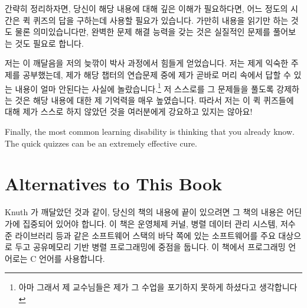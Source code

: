 간략히 정리하자면, 당신이 해당 내용에 대해 깊은 이해가 필요하다면, 어느 정도의
시간은 퀵 퀴즈의 답을 구하는데 사용할 필요가 있습니다.
가만히 내용을 읽기만 하는 것도 물론 의미있습니다만, 완벽한 문제 해결 능력을
갖는 것은 실질적인 문제를 풀어보는 것도 필요로 합니다.

\iffalse
In short, if you need a deep
understanding of the material, then you should invest some time
into answering the Quick Quizzes.
Don't get me wrong, passively reading the material can be quite
valuable, but gaining full problem-solving capability really
does require that you practice solving problems.
\fi

저는 이 깨달음을 저의 늦깎이 박사 과정에서 힘들게 얻었습니다.  저는 제게 익숙한
주제를 공부했는데, 제가 해당 챕터의 연습문제 중에 제가 곧바로 머리 속에서 답할
수 있는 내용이 얼마 안된다는 사실에 놀랐습니다.\footnote{ 아마 그래서 제
교수님들은 제가 그 수업을 포기하지 못하게 하셨다고 생각합니다} 저 스스로를 그
문제들을 풀도록 강제하는 것은 해당 내용에 대한 제 기억력을 매우 높였습니다.
따라서 저는 이 퀵 퀴즈들에 대해 제가 스스로 하지 않았던 것을 여러분에게
강요하고 있지는 않아요!

\iffalse
I learned this the hard way during coursework for my late-in-life
Ph.D.
I was studying a familiar topic, and was surprised at how few of
the chapter's exercises I could answer off the top of my head.\footnote{
	So I suppose that it was just as well that my professors refused
	to let me waive that class!}
Forcing myself to answer the questions greatly increased my
retention of the material.
So with these Quick Quizzes I am not asking you to do anything
that I have not been doing myself!
\fi

Finally, the most common learning disability is thinking that
you already know.
The quick quizzes can be an extremely effective cure.

\section{Alternatives to This Book}
\label{sec:Alternatives to This Book}

Knuth 가 깨달았던 것과 같이, 당신의 책의 내용에 끝이 있으려면 그 책의 내용은
어딘가에 집중되어 있어야 합니다.  이 책은 운영체제 커널, 병렬 데이터 관리
시스템, 저수준 라이브러리 등과 같은 소프트웨어 스택의 바닥 쪽에 있는
소프트웨어를 주요 대상으로 두고 공유메모리 기반 병렬 프로그래밍에 중점을
둡니다.
이 책에서 프로그래밍 언어로는 C 언어를 사용합니다.

\iffalse
As Knuth learned, if you want your book to be finite, it must be focused.
This book focuses on shared-memory parallel programming, with an
emphasis on software that lives near the bottom of the software stack,
such as operating-system kernels, parallel data-management systems,
low-level libraries, and the like.
The programming language used by this book is C.
\fi

